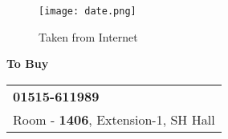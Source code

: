 \documentclass{article}
\begin{document}
\vspace*{\fill}
\begin{center}
  \begin{figure}
  \texttt{[image: date.png]}
    \caption{Taken from Internet}
  \end{figure}
  {\Huge\textbf{To Buy}}
  \\
  \LARGE
\vspace{2cm}
  \begin{tabular}{l}
    \faPhone{} \textbf{01515-611989}\\
    \faHome{} Room - \textbf{1406}, Extension-1, SH Hall
  \end{tabular}
\end{center}
\vspace*{\fill}
 
\end{document}
